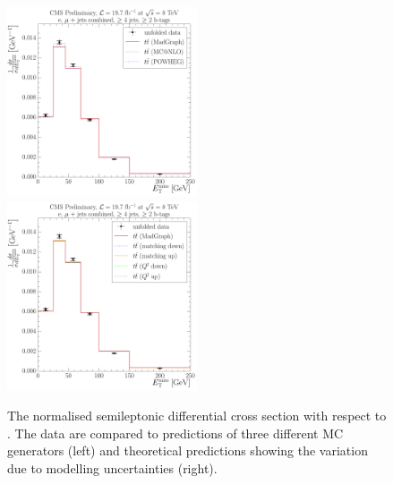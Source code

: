 \begin{figure}[!htbp]
	\centering
  	{\includegraphics[width=0.5\textwidth]{measurement/MET/central/normalised_xsection_combined_different_generators}}\hfill
  	{\includegraphics[width=0.5\textwidth]{measurement/MET/central/normalised_xsection_combined_systematics_shifts}}
    \caption[The normalised semileptonic \ttbar differential cross section with respect to \MET.]{The normalised
      semileptonic \ttbar differential cross section with respect to \MET. The data are compared to predictions of three
      different MC generators (left) and theoretical predictions showing the variation due to modelling uncertainties
      (right).}
    \label{fig:results_MET_combined}
\end{figure}

